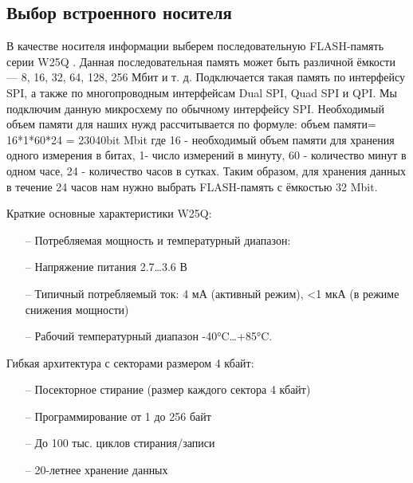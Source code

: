 \begin{sloppypar} %


\subsection{Выбор встроенного носителя}
 В качестве носителя информации выберем последовательную FLASH-память серии W25Q \cite{W25Q}. Данная последовательная память может быть различной ёмкости — 8, 16, 32, 64, 128, 256 Мбит и т. д. Подключается такая память по интерфейсу SPI, а также по многопроводным интерфейсам Dual SPI, Quad SPI и QPI. Мы подключим данную микросхему по обычному интерфейсу SPI.
Необходимый объем памяти для наших нужд рассчитывается по формуле: объем памяти= 16*1*60*24 = 23040bit  Mbit
где 16 - необходимый объем памяти для хранения одного измерения в битах, 1- число измерений в минуту, 60 - количество минут в одном часе, 24 - количество часов в сутках.
Таким образом, для хранения данных в течение 24 часов нам нужно выбрать FLASH-память с ёмкостью 32 Mbit.

 
 
 

Краткие основные характеристики W25Q:

\begin{onehalfspace}
	\begin{itemize}
		\item[--]Потребляемая мощность и температурный диапазон:
		\item[--]Напряжение питания 2.7…3.6 В
		\item[--]Типичный потребляемый ток: 4 мА (активный режим), <1 мкА (в режиме снижения мощности)
		\item[--]Рабочий температурный диапазон -40°C…+85°C.
	\end{itemize}
\end{onehalfspace}

Гибкая архитектура с секторами размером 4 кбайт:
\begin{onehalfspace}
	\begin{itemize}
		\item[--]Посекторное стирание (размер каждого сектора 4 кбайт)
		\item[--]Программирование от 1 до 256 байт
		\item[--]До 100 тыс. циклов стирания/записи
		\item[--] 20-летнее хранение данных
	\end{itemize}
\end{onehalfspace}



\end{sloppypar}
